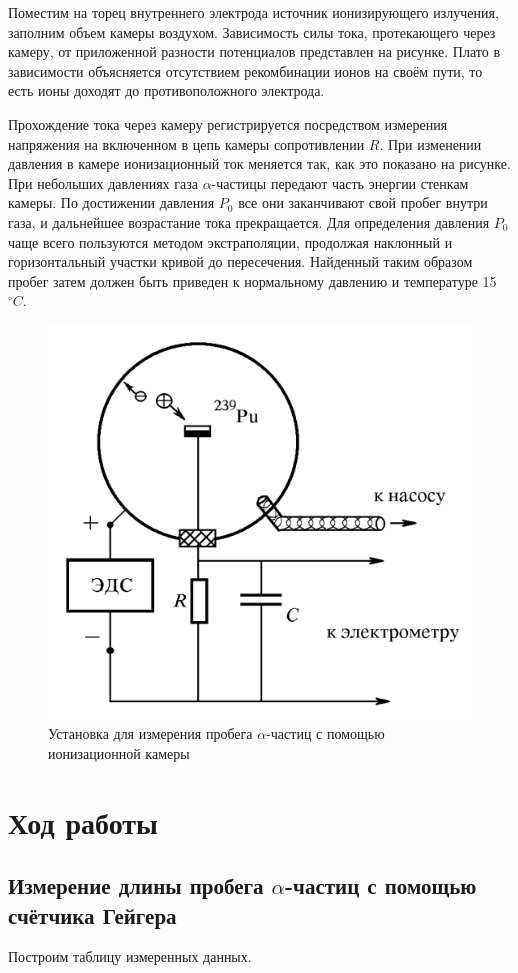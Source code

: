    Поместим на торец внутреннего электрода источник ионизирующего излучения, заполним объем камеры воздухом. Зависимость силы тока, протекающего через камеру, от приложенной разности потенциалов представлен на рисунке. Плато в зависимости объясняется отсутствием рекомбинации ионов на своём пути, то есть ионы доходят до противоположного электрода.

    Прохождение тока через камеру регистрируется посредством измерения напряжения на включенном в цепь камеры сопротивлении $R$. При изменении давления в камере ионизационный ток меняется так, как это показано на рисунке. При небольших давлениях газа $\alpha$-частицы передают часть энергии стенкам камеры. По достижении давления $P_0$ все они заканчивают свой пробег внутри газа, и дальнейшее возрастание тока прекращается. Для определения давления $P_0$ чаще всего пользуются методом экстраполяции, продолжая наклонный и горизонтальный участки кривой до пересечения. Найденный таким образом пробег затем должен быть приведен к нормальному давлению и температуре 15 $^\circ C$.

    \begin{figure}[h!]
        \centering
        \includegraphics[width = 7 cm]{images/ion}
        \caption{Установка для измерения пробега $\alpha$-частиц с помощью ионизационной камеры}
        \label{}
    \end{figure}
    
\section{Ход работы}
\subsection{Измерение длины пробега $\alpha$-частиц с помощью счётчика Гейгера}

    Построим таблицу измеренных данных.

